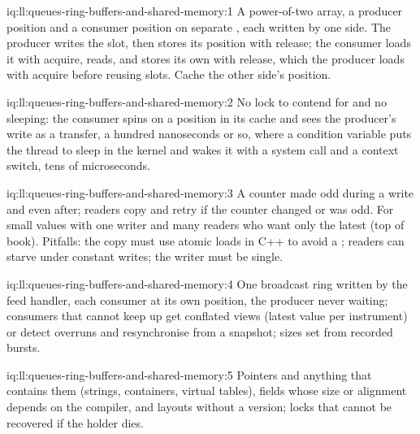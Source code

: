 \begin{solution}{iq:ll:queues-ring-buffers-and-shared-memory:1}
A power-of-two array, a producer position and a consumer position on separate , each written by one side. The producer
writes the slot, then stores its position with release; the consumer loads it with acquire, reads, and stores its own with release,
which the producer loads with acquire before reusing slots. Cache the other side's position.
\end{solution}

\begin{solution}{iq:ll:queues-ring-buffers-and-shared-memory:2}
No lock to contend for and no sleeping: the consumer spins on a position in its cache and sees the producer's write as a  transfer, a hundred nanoseconds or so, where a condition variable puts the thread to sleep in the kernel and wakes it with a
system call and a context switch, tens of microseconds.
\end{solution}

\begin{solution}{iq:ll:queues-ring-buffers-and-shared-memory:3}
A counter made odd during a write and even after; readers copy and retry if the counter changed or was odd. For small values with
one writer and many readers who want only the latest (top of book). Pitfalls: the copy must use atomic loads in C++ to avoid a ; readers can starve under constant writes; the writer must be single.
\end{solution}

\begin{solution}{iq:ll:queues-ring-buffers-and-shared-memory:4}
One broadcast ring written by the feed handler, each consumer at its own position, the producer never waiting; consumers that
cannot keep up get conflated views (latest value per instrument) or detect overruns and resynchronise from a snapshot; sizes set
from recorded bursts.
\end{solution}

\begin{solution}{iq:ll:queues-ring-buffers-and-shared-memory:5}
Pointers and anything that contains them (strings, containers, virtual tables), fields whose size or alignment depends on the
compiler, and layouts without a version; locks that cannot be recovered if the holder dies.
\end{solution}

